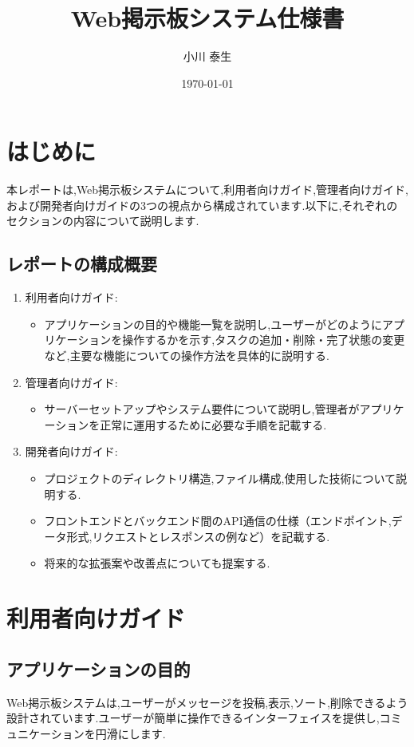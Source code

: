 \documentclass[uplatex,dvipdfmx]{jsarticle}
\title{Web掲示板システム仕様書}
\author{小川 泰生}
\date{\today}
\begin{document}
\maketitle

\tableofcontents

\section{はじめに}
本レポートは,Web掲示板システムについて,利用者向けガイド,管理者向けガイド,および開発者向けガイドの3つの視点から構成されています.以下に,それぞれのセクションの内容について説明します.

\subsection{レポートの構成概要}
\begin{enumerate}
    \item 利用者向けガイド:
    \begin{itemize}
        \item アプリケーションの目的や機能一覧を説明し,ユーザーがどのようにアプリケーションを操作するかを示す,タスクの追加・削除・完了状態の変更など,主要な機能についての操作方法を具体的に説明する.
    \end{itemize}
    \item 管理者向けガイド:
    \begin{itemize}
        \item サーバーセットアップやシステム要件について説明し,管理者がアプリケーションを正常に運用するために必要な手順を記載する.
    \end{itemize}
    \item 開発者向けガイド:
    \begin{itemize}
        \item プロジェクトのディレクトリ構造,ファイル構成,使用した技術について説明する.
        \item フロントエンドとバックエンド間のAPI通信の仕様（エンドポイント,データ形式,リクエストとレスポンスの例など）を記載する.
        \item 将来的な拡張案や改善点についても提案する.
    \end{itemize}
\end{enumerate}

\section{利用者向けガイド}
\subsection{アプリケーションの目的}
Web掲示板システムは,ユーザーがメッセージを投稿,表示,ソート,削除できるよう設計されています.ユーザーが簡単に操作できるインターフェイスを提供し,コミュニケーションを円滑にします.
\end{document}

